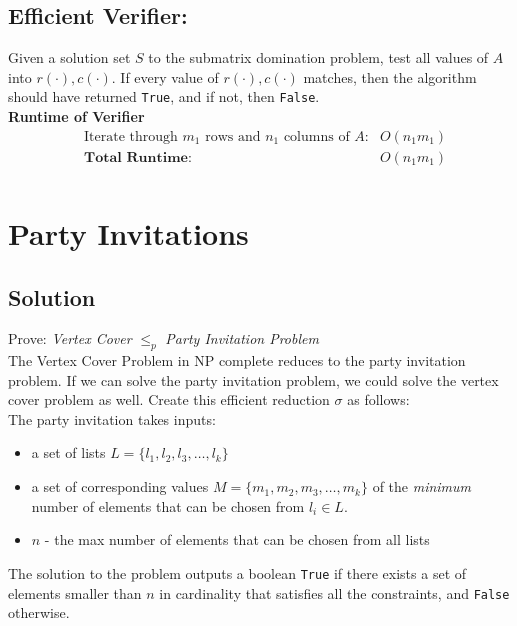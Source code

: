 \documentclass[11pt]{article}
\begin{document}
\subsection{Efficient Verifier:}
Given a solution set $S$ to the submatrix domination problem, test all values of $A$ into $r(\cdot),c(\cdot)$. If every value of $r(\cdot),c(\cdot)$ matches, then the algorithm should have returned \texttt{True}, and if not, then \texttt{False}. \\

\textbf{Runtime of Verifier }
\begin{align*}
&\text{Iterate through $m_1$ rows and $n_1$ columns of $A$:} &O(n_1m_1)\\
&\textbf{Total Runtime: } &O(n_1m_1)\\
\end{align*}

\lobsectionbreak

\section{Party Invitations}

\subsection{Solution}

\BgThispage

Prove: \textit{Vertex Cover} $\leq_p$ \textit{Party Invitation Problem}\\

The Vertex Cover Problem in NP complete reduces to the party invitation problem. If we can solve the party invitation problem, we could solve the vertex cover problem as well. Create this efficient reduction $\sigma$ as follows:  \\

The party invitation takes inputs:
\begin{itemize}
\item a set of lists $L = \{l_1,l_2,l_3, \ldots, l_{k}\}$
\item a set of corresponding values $M = \{m_1, m_2, m_3, \ldots, m_k\}$ of the \textit{minimum} number of elements that can be chosen from $l_i \in L$.
\item $n$ - the max number of elements that can be chosen from all lists
\end{itemize}

The solution to the problem outputs a boolean \texttt{True} if there exists a set of elements smaller than $n$ in cardinality  that satisfies all the constraints, and \texttt{False} otherwise.\\
\end{document}
